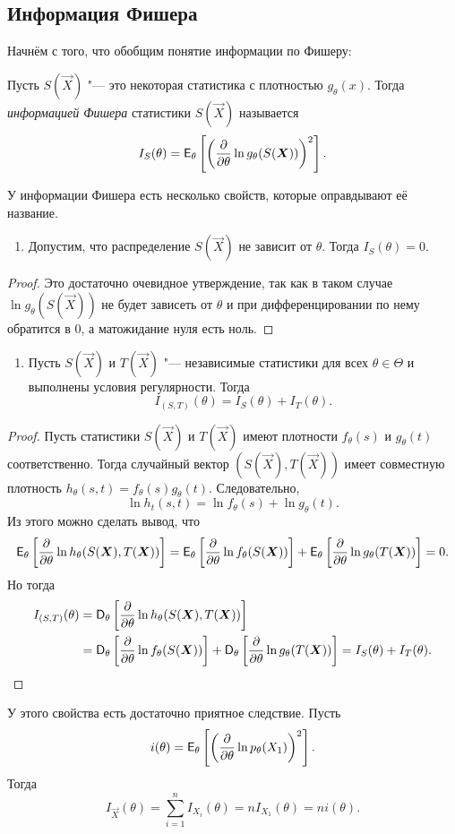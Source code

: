 \subsection{Информация Фишера}
Начнём с того, что обобщим понятие информации по Фишеру:
\begin{definition}
	Пусть $S(\vec{X})$ "--- это некоторая статистика с плотностью $g_{\theta}(x)$. Тогда \emph{информацией Фишера} статистики $S(\vec{X})$ называется
	\[
		I_{S}(\theta) = \operatorname{\mathsf{E}}_{\theta}\left[\left(\pdv{\theta} \ln g_{\theta}(S(\bm{X}))\right)^{2}\right].
	\]
\end{definition}
У информации Фишера есть несколько свойств, которые оправдывают её название.
\begin{enumerate}
	\item Допустим, что распределение $S(\vec{X})$ не зависит от $\theta$. Тогда $I_{S}(\theta) = 0$.
\end{enumerate}
\begin{proof}
	Это достаточно очевидное утверждение, так как в таком случае $\ln g_{\theta}(S(\vec{X}))$ не будет зависеть от $\theta$ и при дифференцировании по нему обратится в 0, а матожидание нуля есть ноль.
\end{proof}
\begin{enumerate}[resume]
	\item Пусть $S(\vec{X})$ и $T(\vec{X})$ "--- независимые статистики для всех $\theta \in \Theta$ и выполнены условия регулярности. Тогда
	\[
		I_{(S, T)}(\theta) = I_{S}(\theta) + I_{T}(\theta).
	\]
\end{enumerate}
\begin{proof}
	Пусть статистики $S(\vec{X})$ и $T(\vec{X})$ имеют плотности $f_{\theta}(s)$ и $g_{\theta}(t)$ соответственно. Тогда случайный вектор $(S(\vec{X}), T(\vec{X}))$ имеет совместную плотность $h_{\theta}(s, t) = f_{\theta}(s)g_{\theta}(t)$. Следовательно,
	\[
		\ln h_{t}(s, t) = \ln f_{\theta}(s) + \ln g_{\theta}(t).
	\]
	Из этого можно сделать вывод, что
	\[
		\operatorname{\mathsf{E}}_{\theta}\left[\pdv{\theta} \ln h_{\theta}(S(\bm{X}), T(\bm{X}))\right] 
		= \operatorname{\mathsf{E}}_{\theta}\left[\pdv{\theta} \ln f_{\theta}(S(\bm{X}))\right] + \operatorname{\mathsf{E}}_{\theta}\left[\pdv{\theta} \ln g_{\theta}(T(\bm{X}))\right]
		= 0.
	\] 
	Но тогда
	\begin{align*}
		I_{(S, T)}(\theta) 
		&= \operatorname{\mathsf{D}}_{\theta}\left[\pdv{\theta} \ln h_{\theta}(S(\bm{X}), T(\bm{X}))\right] \\
		&= \operatorname{\mathsf{D}}_{\theta}\left[\pdv{\theta} \ln f_{\theta}(S(\bm{X}))\right] + \operatorname{\mathsf{D}}_{\theta}\left[\pdv{\theta} \ln g_{\theta}(T(\bm{X}))\right]
		= I_{S}(\theta) + I_{T}(\theta). \qedhere
	\end{align*}
\end{proof}
У этого свойства есть достаточно приятное следствие. Пусть
\[
	i(\theta) = \operatorname{\mathsf{E}}_{\theta}\left[\left(\pdv{\theta} \ln p_{\theta}(X_{1})\right)^{2}\right].
\]
Тогда
\[
	I_{\vec{X}}(\theta) = \sum_{i = 1}^{n} I_{X_{i}}(\theta) = nI_{X_{1}}(\theta) = ni(\theta).
\]

